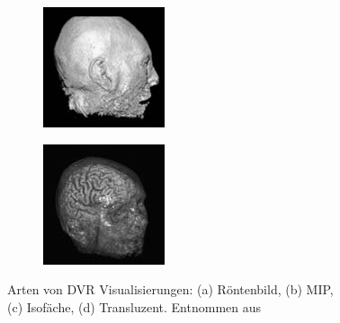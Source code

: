 \documentclass[a4paper,fontsize=12pt,toc=bib,halfparskip]{scrartcl}
\begin{document}
\begin{figure}
\begin{subfigure}{0.24\textwidth}
		\subcaption{}
		\label{DVR:MIP}
	\end{subfigure}
	\begin{subfigure}{0.24\textwidth}
		\includegraphics[width=\textwidth]{pictures/Iso.png}
		\subcaption{}
		\label{DVR:Isosurface}
	\end{subfigure}
	\begin{subfigure}{0.24\textwidth}
		\includegraphics[width=\textwidth]{pictures/Trans.png}
		\subcaption{}
		\label{DVR:Translucent}
	\end{subfigure}
	\caption{Arten von DVR Visualisierungen: (a) R\"ontenbild, (b) MIP,\\ 
		(c) Isof\"ache, (d) Transluzent. Entnommen aus \cite[S.~134]{hansen2005visualization}}
	\label{DVRModes}
\end{figure}
\end{document}
